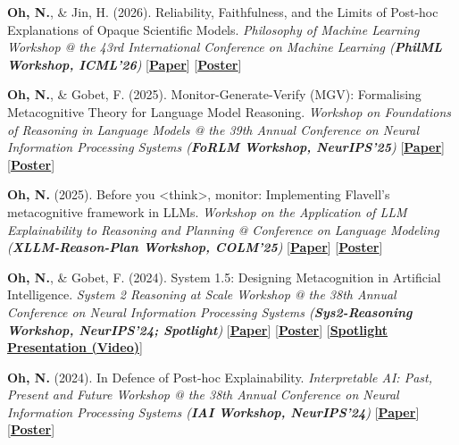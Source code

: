 \documentclass[10pt]{article}
\newlength{\labelw}\setlength{\labelw}{123pt}
\newlength{\colgap}\setlength{\colgap}{3pt}
\newlength{\contentw}\setlength{\contentw}{381pt}
\newcommand{\lblfont}{\fontsize{7.5}{9.5}\selectfont}
\newcommand{\lbl}[1]{{\lblfont\textls[90]{#1}}}
\newcommand{\plink}[2]{[\href{#1}{\textcolor{linkblue}{\uline{\textbf{#2}}}}]} %
\newcommand{\secrule}{\par\needspace{48pt}\vspace{11pt}\noindent{\color{textcol}\rule{\textwidth}{0.75pt}}\par\vspace{10pt}\nopagebreak}
\newcommand{\cvrow}[2]{\noindent\begin{minipage}[t]{\labelw}\raggedright\lbl{#1}\end{minipage}\hspace{\colgap}%
\begin{minipage}[t]{\contentw}#2\end{minipage}\par}
\newcommand{\controw}[1]{\vspace{10pt}\noindent\hspace{\labelw}\hspace{\colgap}%
\begin{minipage}[t]{\contentw}#1\end{minipage}\par}
\begin{document}
\secrule
\cvrow{WORKSHOPS}{%
\textbf{Oh, N.}, \& Jin, H. (2026). Reliability, Faithfulness, and the Limits of Post-hoc Explanations of Opaque Scientific Models. \textit{Philosophy of Machine Learning Workshop @ the 43rd International Conference on Machine Learning (\textbf{PhilML Workshop, ICML'26})} \plink{https://arxiv.org/abs/2606.29346}{Paper} \plink{https://nick-sh-oh.github.io/pdf/limitsofxai_poster.pdf}{Poster}}
\controw{%
\textbf{Oh, N.}, \& Gobet, F. (2025). Monitor-Generate-Verify (MGV): Formalising Metacognitive Theory for Language Model Reasoning. \textit{Workshop on Foundations of Reasoning in Language Models @ the 39th Annual Conference on Neural Information Processing Systems (\textbf{FoRLM Workshop, NeurIPS'25})} \plink{https://arxiv.org/abs/2511.04341}{Paper} \plink{https://nick-sh-oh.github.io/pdf/mgv_poster.pdf}{Poster}}
\controw{%
\textbf{Oh, N.} (2025). Before you <think>, monitor: Implementing Flavell's metacognitive framework in LLMs. \textit{Workshop on the Application of LLM Explainability to Reasoning and Planning @ Conference on Language Modeling (\textbf{XLLM-Reason-Plan Workshop, COLM'25})} \plink{https://arxiv.org/abs/2510.16374}{Paper} \plink{https://nick-sh-oh.github.io/pdf/beforeyouthink_poster.pdf}{Poster}}
\controw{%
\textbf{Oh, N.}, \& Gobet, F. (2024). System 1.5: Designing Metacognition in Artificial Intelligence. \textit{System 2 Reasoning at Scale Workshop @ the 38th Annual Conference on Neural Information Processing Systems (\textbf{Sys2-Reasoning Workshop, NeurIPS'24; Spotlight})} \plink{https://neurips.cc/virtual/2024/104306}{Paper} \plink{https://nick-sh-oh.github.io/pdf/sys1point5_poster.pdf}{Poster} \plink{https://www.youtube.com/watch?v=BedeAoplLVk}{Spotlight Presentation (Video)}}
\controw{%
\textbf{Oh, N.} (2024). In Defence of Post-hoc Explainability. \textit{Interpretable AI: Past, Present and Future Workshop @ the 38th Annual Conference on Neural Information Processing Systems (\textbf{IAI Workshop, NeurIPS'24})} \plink{https://arxiv.org/abs/2412.17883}{Paper} \plink{https://nick-sh-oh.github.io/pdf/indefenceofxai_poster.pdf}{Poster}}
\end{document}

